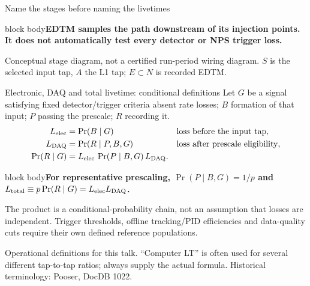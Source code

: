 \documentclass[aspectratio=169,11pt]{beamer}
\newcommand{\source}[1]{\par\vfill{\scriptsize\color{muted}#1\par}}
\newcommand{\takeaway}[1]{\begin{beamercolorbox}[sep=2.5mm,wd=\linewidth]{block body}\textbf{#1}\end{beamercolorbox}}
\begin{document}
\begin{frame}{Name the stages before naming the livetimes}
\centering
{}
\vspace{4mm}
\takeaway{EDTM samples the path downstream of its injection points. It does not automatically test every detector or NPS trigger loss.}
\source{Conceptual stage diagram, not a certified run-period wiring diagram. $S$ is the selected input tap, $A$ the L1 tap; $E\subset N$ is recorded EDTM.}
\end{frame}

\begin{frame}{Electronic, DAQ and total livetime: conditional definitions}
\small
Let $G$ be a signal satisfying fixed detector/trigger criteria absent rate losses; $B$ formation of that input; $P$ passing the prescale; $R$ recording it.
\begin{align*}
L_{\rm elec}&=\Pr(B\mid G) &&\text{loss before the input tap},\\
L_{\rm DAQ}&=\Pr(R\mid P,B,G) &&\text{loss after prescale eligibility},\\
\Pr(R\mid G)&=L_{\rm elec}\,\Pr(P\mid B,G)\,L_{\rm DAQ}.
\end{align*}
\takeaway{For representative prescaling, $\Pr(P\mid B,G)=1/p$ and $L_{\rm total}\equiv p\Pr(R\mid G)=L_{\rm elec}L_{\rm DAQ}$.}
\vspace{2mm}
\small The product is a conditional-probability chain, not an assumption that losses are independent. Trigger thresholds, offline tracking/PID efficiencies and data-quality cuts require their own defined reference populations.
\source{Operational definitions for this talk. ``Computer LT'' is often used for several different tap-to-tap ratios; always supply the actual formula. Historical terminology: Pooser, DocDB 1022.}
\end{frame}
\end{document}
